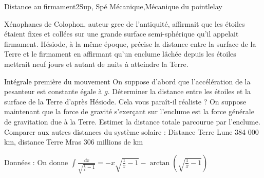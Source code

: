 \begin{exercise}{Distance au firmament}{2}{Sup, Spé}
{Mécanique,Mécanique du point}{lelay}

Xénophanes de Colophon, auteur grec de l'antiquité, affirmait que les étoiles étaient fixes et collées sur une grande surface semi-sphérique qu'il appelait firmament. Hésiode, à la même époque, précise la distance entre la surface de la Terre et le firmament en affirmant qu'un enclume lâchée depuis les étoiles mettrait neuf jours et autant de nuits à atteindre la Terre.  

\begin{questions}
    \questioncours Intégrale première du mouvement
    \question On suppose d'abord que l'accélération de la pesanteur est constante égale à $g$. Déterminer la distance entre les étoiles et la surface de la Terre d'après Hésiode. Cela vous paraît-il réaliste ?
    \question On suppose maintenant que la force de gravité s'exerçant sur l'enclume est la force générale de gravitation due à la Terre. Estimer la distance totale parcourue par l'enclume.
    \question Comparer aux autres distances du système solaire : Distance Terre Lune 384 000 km, distance Terre Mras 306 millions de km
\end{questions}

Données : On donne $\int \frac{\dd{x}}{\sqrt{\frac1x-1}} = -x\sqrt{\frac1x-1} - \arctan(\sqrt{\frac1x-1})$
\end{exercise}